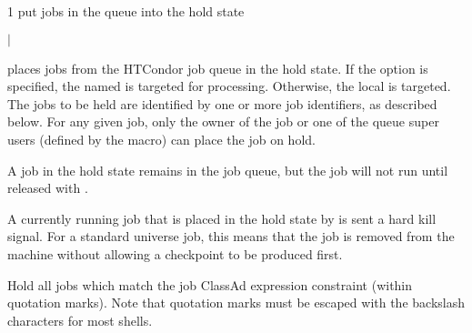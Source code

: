 \begin{ManPage}{\label{man-condor-hold}}{1}
{put jobs in the queue into the hold state}

\Synopsis {}
\ToolArgsBase

\ToolDebugOption
{}
\ToolLocate 
\ToolJobs
$|$  \Dots 

\ToolDebugOption
{}
\ToolLocate 
\ToolAll

\Description

 places jobs from the HTCondor job queue in
the hold state.
If the  option is specified, the named  is targeted
for processing.  
Otherwise, the local  is targeted.
The jobs to be held are identified by one or more job identifiers, as
described below.
For any given job, only the owner of the job or one of the queue super users
(defined by the  macro) can place the job on hold.

A job in the hold state remains in the job queue,
but the job will not run until released with .

A currently running job that is placed in the hold state by 
is sent a hard kill signal.
For a standard universe job,
this means that the job is removed from the machine without
allowing a checkpoint to be produced first.

\begin{Options}

  \ToolArgsBaseDesc
  \ToolLocateDesc
  \ToolDebugDesc
   {Hold all jobs which match
    the job ClassAd expression constraint (within quotation
    marks).
    Note that quotation marks must be escaped with the
    backslash characters for most shells.  }


\end{Options}
\end{ManPage}
